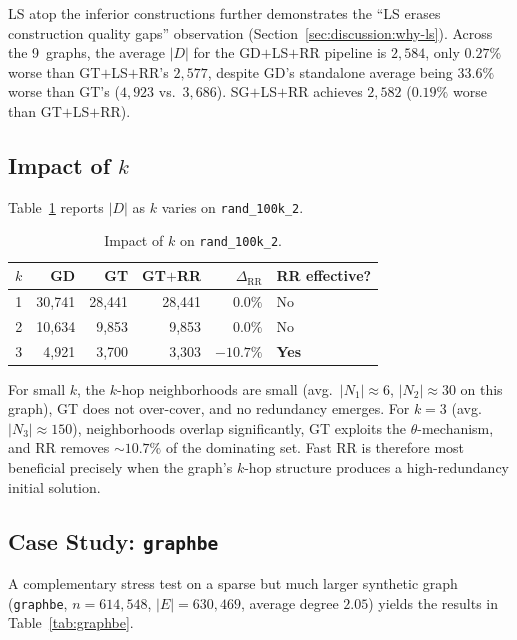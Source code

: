 \documentclass[11pt,a4paper]{article}
\begin{document}
LS atop the inferior constructions further demonstrates the
``LS erases construction quality gaps'' observation
(Section~\ref{sec:discussion:why-ls}). Across the 9~graphs, the average
$|D|$ for the GD$+$LS$+$RR pipeline is $2{,}584$, only $0.27\%$ worse
than GT$+$LS$+$RR's $2{,}577$, despite GD's standalone average being
$33.6\%$ worse than GT's
($4{,}923$ vs.\ $3{,}686$).
SG$+$LS$+$RR achieves $2{,}582$ ($0.19\%$ worse than GT$+$LS$+$RR).


\subsection{Impact of $k$}
\label{sec:exp:k}

Table~\ref{tab:impact-k} reports $|D|$ as $k$ varies on
\texttt{rand\_100k\_2}.

\begin{table}[ht]
\centering
\caption{Impact of $k$ on \texttt{rand\_100k\_2}.}
\label{tab:impact-k}
\begin{tabular}{crrrrl}
\toprule
$k$ & \textbf{GD} & \textbf{GT} & \textbf{GT$+$RR}
  & $\Delta_{\text{RR}}$ & \textbf{RR effective?}\\
\midrule
1 & 30{,}741 & 28{,}441 & 28{,}441 & $0.0\%$ & No \\
2 & 10{,}634 &  9{,}853 &  9{,}853 & $0.0\%$ & No \\
3 &  4{,}921 &  3{,}700 &  3{,}303 & $-10.7\%$ & \textbf{Yes}\\
\bottomrule
\end{tabular}
\end{table}

For small $k$, the $k$-hop neighborhoods are small (avg.\ $|N_1|\approx 6$,
$|N_2|\approx 30$ on this graph), GT does not over-cover, and no
redundancy emerges. For $k=3$ (avg.\ $|N_3|\approx 150$), neighborhoods
overlap significantly, GT exploits the $\theta$-mechanism, and RR
removes ${\sim}10.7\%$ of the dominating set. Fast RR is therefore most
beneficial precisely when the graph's $k$-hop structure produces a
high-redundancy initial solution.


\subsection{Case Study: \texttt{graphbe}}
\label{sec:exp:graphbe}

A complementary stress test on a sparse but much larger synthetic graph
(\texttt{graphbe}, $n=614{,}548$, $|E|=630{,}469$,
average degree $2.05$) yields the results in
Table~\ref{tab:graphbe}.
\end{document}
